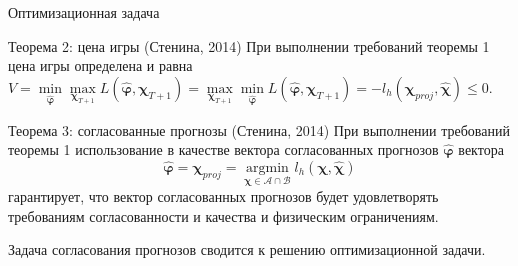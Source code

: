 \documentclass{beamer}
\newcommand\argmin{\mathop{\arg\min}}
\newcommand{\A}{\mathcal{A}}
\newcommand{\hchi}{\hat{\boldsymbol{\chi}}}
\newcommand{\hphi}{\hat{\boldsymbol{\varphi}}}
\newcommand{\B}{\mathcal{B}}
\begin{document}
%
%
%
%
%
%
%
%

\begin{frame}{Оптимизационная задача}
\small \vspace{-0.2cm}
    \begin{block}{Теорема 2: цена игры (Стенина, 2014)}
        При выполнении требований теоремы 1 цена игры определена и равна
        $
            {V = \min\limits_{\hphi} \max\limits_{\boldsymbol{\chi}_{T+1}} L(\hphi, \boldsymbol{\chi}_{T+1}) =
                \max\limits_{\boldsymbol{\chi}_{T+1}} \min\limits_{\hphi} L(\hphi, \boldsymbol{\chi}_{T+1}) = -l_h(\boldsymbol{\chi}_{proj},
                \hchi) \leq 0}.
        $
    \end{block}
    \vspace{-0.15cm}

    \begin{block}{Теорема 3: согласованные прогнозы (Стенина, 2014)}
        При выполнении требований теоремы 1 использование в качестве вектора согласованных прогнозов $\hphi$
        вектора
        $$
            \hphi = \boldsymbol{\chi}_{proj} = \argmin\limits_{\boldsymbol{\chi} \in \A \cap
            \B} l_h(\boldsymbol{\chi}, \hchi)
        $$
        гарантирует, что вектор согласованных прогнозов будет
        удовлетворять требованиям согласованности и качества и
        физическим ограничениям.
    \end{block}
\vspace{-0.1cm}
    \textcolor[rgb]{1.00,0.00,0.00}{Задача согласования прогнозов сводится к решению
    оптимизационной задачи.}

\end{frame}
\end{document}
